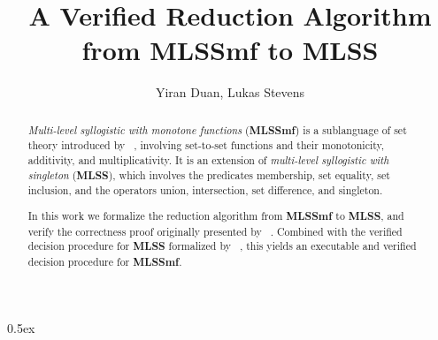 \documentclass[11pt,a4paper]{article}
\newcommand{\mlss}{\textbf{MLSS}}
\newcommand{\mlssmf}{\textbf{MLSSmf}}
\begin{document}
\title{A Verified Reduction Algorithm from MLSSmf to MLSS}
\author{Yiran Duan, Lukas Stevens}
\maketitle

\begin{abstract}
\textit{Multi-level syllogistic with monotone functions} (\mlssmf{}) is a sublanguage of set theory introduced by \citeauthor{mlssmf_II}~\cite{mlssmf_II}, 
involving set-to-set functions and their monotonicity, additivity, and multiplicativity. It is an extension of \textit{multi-level syllogistic with singleton} (\mlss{}), which involves the predicates membership, set equality, set inclusion, and the operators union, intersection, set difference, and singleton.

In this work we formalize the reduction algorithm from \mlssmf{} 
to \mlss{}, and verify the correctness proof originally presented by \citeauthor{mlssmf_II}~\cite{mlssmf_II}. Combined with the verified decision procedure for \mlss{} formalized by \citeauthor{MLSS_Decision_Proc-AFP}~\cite{MLSS_Decision_Proc-AFP}, this yields an executable and verified decision procedure for \mlssmf{}.
\end{abstract}

\newpage

\parindent 0pt\parskip 0.5ex



\nocite{*}


\end{document}
